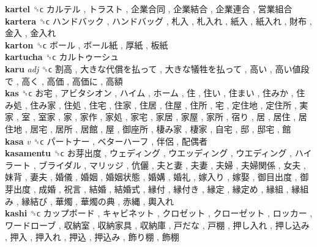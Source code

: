 \textbf{kartel} ␝ϲ   カルテル ,  トラスト ,  企業合同 ,  企業結合 ,  企業連合 ,  営業組合   \\
\textbf{kartera} ␝ϲ   ハンドバック ,  ハンドバッグ ,  札入 ,  札入れ ,  紙入 ,  紙入れ ,  財布 ,  金入 ,  金入れ   \\
\textbf{karton} ␝ϲ   ボール ,  ボール紙 ,  厚紙 ,  板紙   \\
\textbf{kartucha} ␝ϲ   カルトゥーシュ   \\
\textbf{karu} \emph{adj}  ␝ϲ   割高 ,  大きな代償を払って ,  大きな犠牲を払って ,  高い ,  高い値段で ,  高く ,  高価 ,  高価に ,  高額   \\
\textbf{kas} ␝ϲ   お宅 ,  アビタシオン ,  ハイム ,  ホーム ,  住 ,  住い ,  住まい ,  住みか ,  住み処 ,  住み家 ,  住処 ,  住宅 ,  住家 ,  住居 ,  住屋 ,  住所 ,  宅 ,  定住地 ,  定住所 ,  実家 ,  室 ,  室家 ,  家 ,  家作 ,  家処 ,  家宅 ,  家居 ,  家屋 ,  家所 ,  宿り ,  居 ,  居住 ,  居住地 ,  居宅 ,  居所 ,  居館 ,  屋 ,  御座所 ,  棲み家 ,  棲家 ,  自宅 ,  邸 ,  邸宅 ,  館   \\
\textbf{kasa} \emph{v}  ␝ϲ   パートナー ,  ベターハーフ ,  伴侶 ,  配偶者   \\
\textbf{kasamentu} ␝ϲ   お芽出度 ,  ウェディング ,  ウエッディング ,  ウエディング ,  ハイラート ,  ブライダル ,  マリッジ ,  伉儷 ,  夫と妻 ,  夫妻 ,  夫婦 ,  夫婦関係 ,  女夫 ,  妹背 ,  妻夫 ,  婚儀 ,  婚姻 ,  婚姻状態 ,  婚媾 ,  婚礼 ,  嫁入り ,  嫁娶 ,  御目出度 ,  御芽出度 ,  成婚 ,  祝言 ,  結婚 ,  結婚式 ,  縁付 ,  縁付き ,  縁定 ,  縁定め ,  縁組 ,  縁組み ,  縁結び ,  華燭 ,  華燭の典 ,  赤縄 ,  輿入れ   \\
\textbf{kashi} ␝ϲ   カップボード ,  キャビネット ,  クロゼット ,  クローゼット ,  ロッカー ,  ワードローブ ,  収納室 ,  収納家具 ,  収納庫 ,  戸だな ,  戸棚 ,  押し入れ ,  押し込み ,  押入 ,  押入れ ,  押込 ,  押込み ,  飾り棚 ,  飾棚   \\
